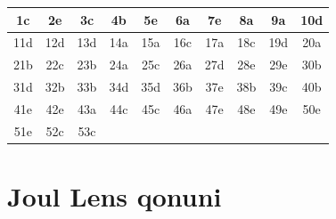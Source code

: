 \begin{table}[h!]
\centering
\begin{tabular}{|c|c|c|c|c|c|c|c|c|c|}
\hline
1c & 2e & 3c & 4b & 5e & 6a & 7e & 8a & 9a & 10d \\ \hline
11d & 12d & 13d & 14a & 15a & 16c & 17a & 18c & 19d & 20a \\ \hline
21b & 22c & 23b & 24a & 25c & 26a & 27d & 28e & 29e & 30b \\ \hline
31d & 32b & 33b & 34d & 35d & 36b & 37e & 38b & 39c & 40b \\ \hline
41e & 42e & 43a & 44c & 45c & 46a & 47e & 48e & 49e & 50e \\ \hline
 51e & 52c & 53c &  &  &  &  & & &  \\ \hline
\end{tabular}
\end{table}











\section{Joul Lens qonuni}


